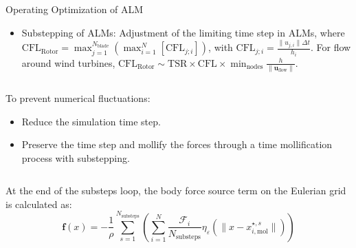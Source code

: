 \documentclass[10pt]{beamer}
\begin{document}
\begin{frame}{Operating Optimization of ALM}
\begin{itemize}
\justifying
\item[\ding{252}] Substepping of ALMs: Adjustment of the limiting time step in ALMs, where $\mathrm{CFL}_{\text{Rotor}} = \max_{j=1}^{N_{\text{blade}}}\left(\max_{i=1}^{N}\left[\mathrm{CFL}_{j;i}\right]\right)$, with $\mathrm{CFL}_{j;i} = \frac{\|u_{j,i}\|\Delta t}{h_i}$. For flow around wind turbines, $\mathrm{CFL}_{\text{Rotor}} \sim \mathrm{TSR}\times\mathrm{CFL}\times\min_{\text{nodes}} \frac{h}{\|\mathbf{u}_{\text{flow}}\|}$.
\end{itemize}
\begin{columns}
\begin{column}{0.6\textwidth}
To prevent numerical fluctuations:
\begin{itemize}
\justifying
\item[\ding{212}] Reduce the simulation time step.
\item[\ding{212}] Preserve the time step and mollify the forces through a time mollification process with substepping.
\end{itemize}
\end{column}
\begin{column}{0.50\textwidth}
\end{column}
\end{columns}
At the end of the substeps loop, the body force source term on the Eulerian grid is calculated as:
$$\mathbf{f}(x)=-\frac{1}{\rho}\sum_{s=1}^{N_{\text{substeps}}}\left(\sum_{i=1}^{N}\frac{\mathcal{F}_i}{N_{\text{substeps}}}\eta_{\varepsilon}\left(\|x-x_{i,\text{mol}}^{\star,s}\|\right)\right)$$
\end{frame}
\end{document}
